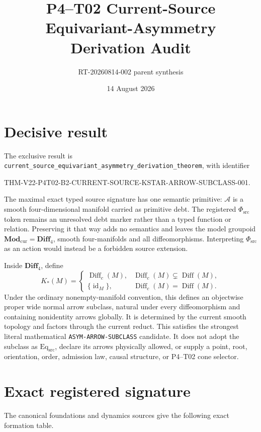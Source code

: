 \documentclass[11pt]{article}
\title{P4--T02 Current-Source Equivariant-Asymmetry\\Derivation Audit}
\author{RT-20260814-002 parent synthesis}
\date{14 August 2026}
\newcommand{\Sub}{\mathcal{A}}
\newcommand{\PhiSrc}{\Phi_{\mathrm{src}}}
\newcommand{\ModCur}{\mathbf{Mod}_{\mathrm{cur}}}
\newcommand{\DiffFour}{\mathbf{Diff}_{4}}
\begin{document}
\maketitle

\section{Decisive result}

The exclusive result is
\texttt{current\_source\_equivariant\_asymmetry\_derivation\_theorem},
with identifier
\begin{center}
\small\ttfamily
THM-V22-P4T02-B2-CURRENT-SOURCE-KSTAR-ARROW-SUBCLASS-001.
\end{center}

The maximal exact typed source signature has one semantic primitive:
\(\Sub\) is a smooth four-dimensional manifold carried as primitive debt.
The registered \(\PhiSrc\) token remains an unresolved debt marker rather than
a typed function or relation.  Preserving it that way adds no semantics and
leaves the model groupoid \(\ModCur=\DiffFour\), smooth four-manifolds and all
diffeomorphisms.  Interpreting \(\PhiSrc\) as an action would instead be a
forbidden source extension.

Inside \(\DiffFour\), define
\[
  K_{\!*}(M)=
  \begin{cases}
    \operatorname{Diff}_{c}(M), &
      \operatorname{Diff}_{c}(M)\subsetneq\operatorname{Diff}(M),\\
    \{\operatorname{id}_{M}\}, &
      \operatorname{Diff}_{c}(M)=\operatorname{Diff}(M).
  \end{cases}
\]
Under the ordinary nonempty-manifold convention, this defines an objectwise
proper wide normal arrow subclass, natural under every diffeomorphism and
containing nonidentity arrows globally.  It is determined by the current
smooth topology and factors through the current reduct.  This satisfies the
strongest literal mathematical
\texttt{ASYM-ARROW-SUBCLASS} candidate.  It does not adopt the subclass as
\(\mathrm{Eq}_{\mathrm{src}}\), declare its arrows physically allowed, or
supply a point, root, orientation, order, admission law, causal structure, or
P4--T02 cone selector.

\section{Exact registered signature}

The canonical foundations and dynamics sources give the following exact
formation table.
\end{document}
